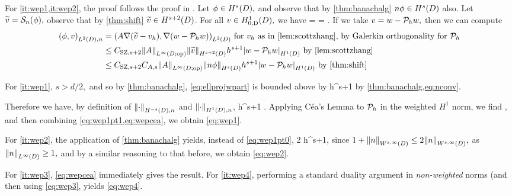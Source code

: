 For \cref{it:wep1,it:wep2}, the proof follows the proof in \cite[Theorem 5.8.3]{BrSc:08}. Let $\phi \in \HsD,$ and observe that by \cref{thm:banachalg} $n\phi\in \HsD$ also. Let $ \widetilde{v} = \mathcal S_{n}(\phi),$ observe that by \cref{thm:shift} $\vtilde \in \Hfn{}{s+2}{D}$. For all $v \in \HozDD,$ we have
\beqs
{} =  = .
\eeqs
If we take $v = w-\mathcal P_{h} w,$ then we can compute
\begin{align}
\IPLtDn{\phi}{v} &= \IPLtD{A\grad\mleft(\vtilde - \vh\mright)}{\grad\mleft(w-\Ph w\mright)} \text{ for } \vh \text{ as in \cref{lem:scottzhang}, by Galerkin orthogonality for } \Ph\nonumber\\
&\leq \CSZfn{s+2}\NLiDop{A} \NHfn{s+2}{D}{\vtilde} h^{s+1} \SNHoD{w-\Ph w} \text{ by \cref{lem:scottzhang}}\nonumber\\
&\leq \CSZfn{s+2} \CAfn{s} \NLiDop{A} \NHfn{s}{D}{n\phi} h^{s+1}\SNHoD{w-\Ph w}\text{ by \cref{thm:shift}}\label{eq:ellprojwpart}
\end{align}

For \cref{it:wep1}, $s > d/2,$ and so by \cref{thm:banachalg}, \cref{eq:ellprojwpart} is bounded above by
\beq\label{eq:wep1pt0}
     h^{s+1}
\eeq
by \cref{thm:banachalg,eq:nconv}.

Therefore we have, by definition of $\NHnfn{-s}{D}{\cdot}$ and $\NHoDn{\cdot}$,
\beq\label{eq:wep1pt1}
 \leq {}    h^{s+1} .
\eeq
Applying C\'ea's Lemma to $\mathcal P_{h}$ in the weighted $H^1$ norm, we find
\beq\label{eq:wepcea}
 \leq {},
\eeq
and then combining \cref{eq:wep1pt1,eq:wepcea}, we obtain \cref{eq:wep1}.

For \cref{it:wep2}, the application of \cref{thm:banachalg} yields, instead of \cref{eq:wep1pt0},
\beq\label{eq:wep2pt1}
2     h^{s+1},
\eeq
since $1 + \NWsiD{n} \leq 2\NWsiD{n},$ as $\NLiD{n} \geq 1,$ and by a similar reasoning to that before, we obtain \cref{eq:wep2}.

For \cref{it:wep3}, \cref{eq:wepcea} immediately gives the result. For \cref{it:wep4}, performing a standard duality argument in \emph{non-weighted} norms (and then using \cref{eq:wep3}, yields \cref{eq:wep4}.
\epf

